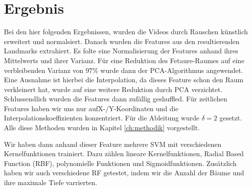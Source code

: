 \chapter{Ergebnis}\label{ch:ergebnis}

Bei den hier folgenden Ergebnissen, wurden die Videos durch Rauschen künstlich erweitert und normalsiert. Danach wurden die Features aus den resultierenden Landmarks extrahiert. Es folte eine Normalisierung der Features anhand ihres Mittelwerts und ihrer Varianz. Für eine Reduktion des Fetaure-Raumes auf eine verbleibenden Varianz von $97\%$ wurde dann der PCA-Algorithmus angewendet. Eine Ausnahme ist hierbei die Interpolation, da dieses Feature schon den Raum verkleinert hat, wurde auf eine weitere Reduktion durch PCA verzichtet. Schlussendlich wurden die Features dann zufällig geshuffled. Für zeitlichen Features haben wir uns nur aufX-/Y-Koordinaten und die Interpolationskoeffizienten konzentriert. Für die Ableitung wurde $\delta=2$ gesetzt.
Alle diese Methoden wurden in Kapitel \ref{ch:methodik} vorgestellt.

Wir haben dann anhand dieser Feature mehrere SVM mit verschiedenen Kernelfunktionen trainiert. Dazu zählen lineare Kernelfunktionen, Radial Based Function (RBF), polynomielle Funktionen und Sigmoidfunktionen. Zusätzlich haben wir auch verschiedene RF getestet, indem wir die Anzahl der Bäume und ihre maximale Tiefe varrierten.

